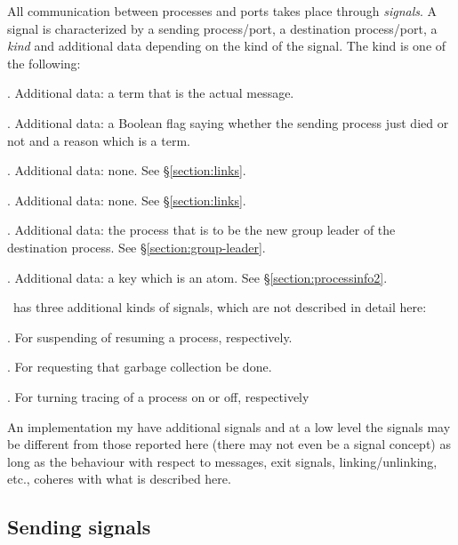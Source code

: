 All communication between processes and ports takes place through \emph{signals}.
A signal is characterized by a sending process/port, a destination process/port,
a \emph{kind} and additional data depending on the kind of the signal.
The kind is one of the following:
\begin{Lentry}
\item[\I{Message}.] Additional data: a term that is the actual message.
\item[\I{Exit signal}.] Additional data: a Boolean flag saying whether
the sending process just died or not and a reason which is a term.
\item[\I{Link request}.] Additional data: none. See \S\ref{section:links}.
\item[\I{Unlink request}.] Additional data: none. See \S\ref{section:links}.
\item[\I{Group leader request}.] Additional data: the process that is to
be the new group leader of the destination process. See \S\ref{section:group-leader}.
\item[\I{Info request}.] Additional data: a key which is an atom. See \S\ref{section:processinfo2}.
\iffalse
\item[\I{Monitor node request}.] Additional data: none. See \S\ref{section:monitor-node}.
\fi
\end{Lentry}
\ifOld
\OldErlang\ has three additional kinds of signals, which are not described in detail here:
\begin{Lentry}
\item[\I{Suspend/resume request}.] For suspending of resuming a process, respectively.
\item[\I{Garbage collection request}.] For requesting that garbage collection be done.
\item[\I{Trace/notrace request}.] For turning tracing of a process on or off, respectively
\end{Lentry}
\fi
\ifNew
An implementation my have additional signals
and at a low level the signals may be different from those reported here (there may
not even be a signal concept) as long as the behaviour with respect to messages,
exit signals, linking/unlinking, etc., coheres with what is described here.
\fi
{}

\subsection{Sending signals}

